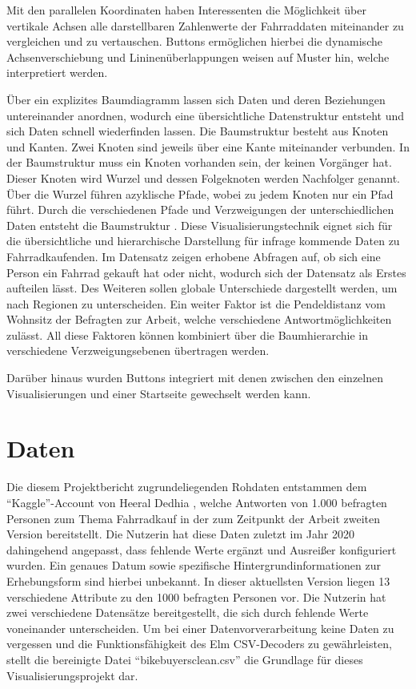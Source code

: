 \documentclass[usegeometry=true]{scrartcl}
\begin{document}
Mit den parallelen Koordinaten haben Interessenten die Möglichkeit über vertikale Achsen alle darstellbaren Zahlenwerte der Fahrraddaten miteinander zu vergleichen und zu vertauschen. Buttons ermöglichen hierbei die dynamische Achsenverschiebung und Lininenüberlappungen weisen auf Muster hin, welche interpretiert werden. 


Über ein explizites Baumdiagramm lassen sich Daten und deren Beziehungen untereinander anordnen, wodurch eine übersichtliche Datenstruktur entsteht und sich Daten schnell wiederfinden lassen. Die Baumstruktur besteht aus Knoten und Kanten. Zwei Knoten sind jeweils über eine Kante miteinander verbunden. In der Baumstruktur muss ein Knoten vorhanden sein, der keinen Vorgänger hat. Dieser Knoten wird Wurzel und dessen Folgeknoten werden Nachfolger genannt. Über die Wurzel führen azyklische Pfade, wobei zu jedem Knoten nur ein Pfad führt. Durch die verschiedenen Pfade und Verzweigungen der unterschiedlichen Daten entsteht die Baumstruktur \cite{Gumm.2016}. Diese Visualisierungstechnik eignet sich für die übersichtliche und hierarchische Darstellung für infrage kommende Daten zu Fahrradkaufenden. Im Datensatz zeigen erhobene Abfragen auf, ob sich eine Person ein Fahrrad gekauft hat oder nicht, wodurch sich der Datensatz als Erstes aufteilen lässt. Des Weiteren sollen globale Unterschiede dargestellt werden, um nach Regionen zu unterscheiden. Ein weiter Faktor ist die Pendeldistanz vom Wohnsitz der Befragten zur Arbeit, welche verschiedene Antwortmöglichkeiten zulässt. All diese Faktoren können kombiniert über die Baumhierarchie in verschiedene Verzweigungsebenen übertragen werden. 

Darüber hinaus wurden Buttons integriert mit denen zwischen den einzelnen Visualisierungen und einer Startseite gewechselt werden kann. 

\section{Daten}
Die diesem Projektbericht zugrundeliegenden Rohdaten entstammen dem "`Kaggle"'-Account von Heeral Dedhia \cite{Dedhia.22.09.2020}, welche Antworten von 1.000 befragten Personen zum Thema Fahrradkauf in der zum Zeitpunkt der Arbeit zweiten Version bereitstellt. Die Nutzerin hat diese Daten zuletzt im Jahr 2020 dahingehend angepasst, dass fehlende Werte ergänzt und Ausreißer konfiguriert wurden. Ein genaues Datum sowie spezifische Hintergrundinformationen zur Erhebungsform sind hierbei unbekannt. In dieser aktuellsten Version liegen 13 verschiedene Attribute zu den 1000 befragten Personen vor. Die Nutzerin hat zwei verschiedene Datensätze bereitgestellt, die sich durch fehlende Werte voneinander unterscheiden. Um bei einer Datenvorverarbeitung keine Daten zu vergessen und die Funktionsfähigkeit des Elm CSV-Decoders zu gewährleisten, stellt die bereinigte Datei "`bikebuyersclean.csv"' die Grundlage für dieses Visualisierungsprojekt dar.
\end{document}

